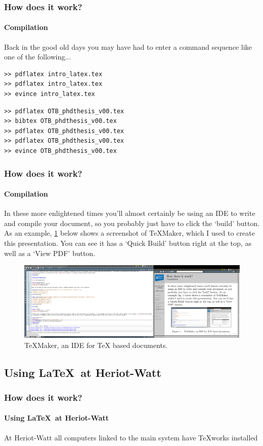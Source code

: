 \documentclass{beamer}
\begin{document}
\lstset{language=bash}

\begin{frame}[fragile]
\frametitle{How does it work?}
\framesubtitle{Compilation}

Back in the good old days you may have had to enter a command sequence like one of the following...

\begin{lstlisting}[caption={Command sequence for this presentation.}, label={lst:1}]
>> pdflatex intro_latex.tex
>> pdflatex intro_latex.tex
>> evince intro_latex.tex
\end{lstlisting}

\begin{lstlisting}[caption={Command sequence for a document containing BibTeX references.}, label={lst:2}]
>> pdflatex OTB_phdthesis_v00.tex
>> bibtex OTB_phdthesis_v00.tex
>> pdflatex OTB_phdthesis_v00.tex
>> pdflatex OTB_phdthesis_v00.tex
>> evince OTB_phdthesis_v00.tex
\end{lstlisting}

\end{frame}

\begin{frame}
\frametitle{How does it work?}
\framesubtitle{Compilation}

In these more enlightened times you'll almost certainly be using an IDE to write and compile your document, so you probably just have to click the `build' button. As an example, \cref{fig:1} below shows a screenshot of TeXMaker, which I used to create this presentation. You can see it has a `Quick Build' button right at the top, as well as a `View PDF' button. 

\begin{figure}[h!]
\centering
\includegraphics[width=0.9\linewidth]{texmaker_scrn}
\caption{TeXMaker, an IDE for TeX based documents.}
\label{fig:1}
\end{figure}

\end{frame}

\subsection[HWU]{Using \LaTeX\ at Heriot-Watt}
\begin{frame}
\frametitle{How does it work?}
\framesubtitle{Using \LaTeX\ at Heriot-Watt}
At Heriot-Watt all computers linked to the main system have TeXworks installed
\end{frame}
\end{document}
